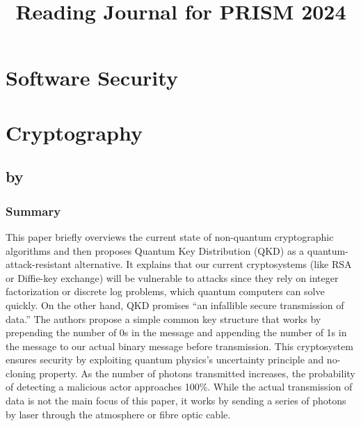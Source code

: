 \documentclass{article}
\begin{document}

\title{Reading Journal for PRISM 2024}
\author{}
\date{}
\maketitle

\section{Software Security}

\section{Cryptography}
\subsection*{ by  \cite{babber_quantum_cryptography}}
\subsubsection*{Summary}
This paper briefly overviews the current state of non-quantum cryptographic algorithms and then proposes Quantum Key Distribution (QKD) as a quantum-attack-resistant alternative. 
It explains that our current cryptosystems (like RSA or Diffie-key exchange) will be vulnerable to attacks since they rely on integer factorization or discrete log problems, which quantum computers can solve quickly.
On the other hand, QKD promises “an infallible secure transmission of data.” 
The authors propose a simple common key structure that works by prepending the number of 0s in the message and appending the number of 1s in the message to our actual binary message before transmission. 
This cryptosystem ensures security by exploiting quantum physics's uncertainty principle and no-cloning property. 
As the number of photons transmitted increases, the probability of detecting a malicious actor approaches 100\%.
While the actual transmission of data is not the main focus of this paper, it works by sending a series of photons by laser through the atmosphere or fibre optic cable. 
\end{document}
